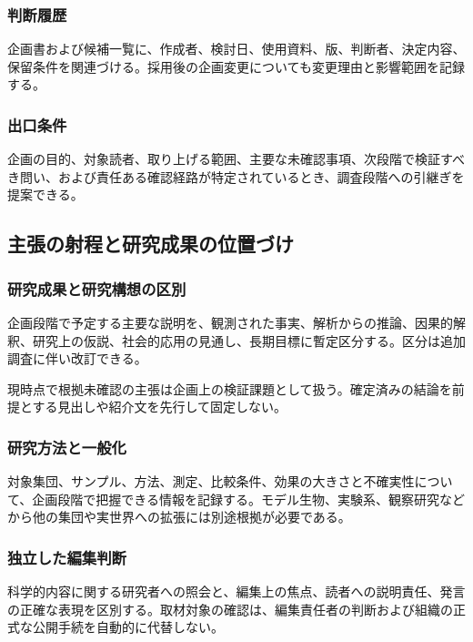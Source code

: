 \documentclass[a4paper,11pt]{article}
\begin{document}
\subsubsection{判断履歴}
\par 企画書および候補一覧に、作成者、検討日、使用資料、版、判断者、決定内容、保留条件を関連づける。採用後の企画変更についても変更理由と影響範囲を記録する。\par\medskip
\subsubsection{出口条件}
\par 企画の目的、対象読者、取り上げる範囲、主要な未確認事項、次段階で検証すべき問い、および責任ある確認経路が特定されているとき、調査段階への引継ぎを提案できる。\par\medskip
\subsection{主張の射程と研究成果の位置づけ}
\subsubsection{研究成果と研究構想の区別}
\par 企画段階で予定する主要な説明を、観測された事実、解析からの推論、因果的解釈、研究上の仮説、社会的応用の見通し、長期目標に暫定区分する。区分は追加調査に伴い改訂できる。\par\medskip
\par 現時点で根拠未確認の主張は企画上の検証課題として扱う。確定済みの結論を前提とする見出しや紹介文を先行して固定しない。\par\medskip
\subsubsection{研究方法と一般化}
\par 対象集団、サンプル、方法、測定、比較条件、効果の大きさと不確実性について、企画段階で把握できる情報を記録する。モデル生物、実験系、観察研究などから他の集団や実世界への拡張には別途根拠が必要である。\par\medskip
\subsubsection{独立した編集判断}
\par 科学的内容に関する研究者への照会と、編集上の焦点、読者への説明責任、発言の正確な表現を区別する。取材対象の確認は、編集責任者の判断および組織の正式な公開手続を自動的に代替しない。\par\medskip
\end{document}
